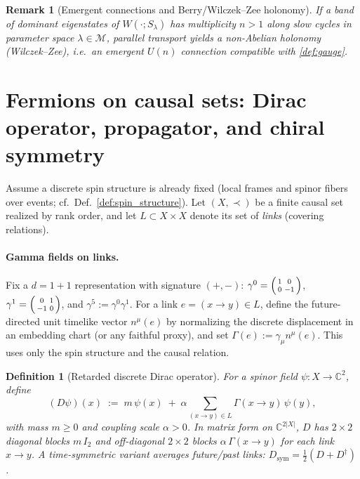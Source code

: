 \documentclass[12pt,a4paper]{article}
\newtheorem{definition}{Definition}
\newtheorem{remark}{Remark}
\begin{document}
\begin{remark}[Emergent connections and Berry/Wilczek--Zee holonomy]\label{rem:berry}
If a band of dominant eigenstates of $W(\cdot;S_\lambda)$ has multiplicity $n>1$ along slow cycles in parameter space $\lambda\in\mathcal M$, parallel transport yields a non-Abelian holonomy (Wilczek--Zee), i.e.\ an emergent $U(n)$ connection compatible with \cref{def:gauge}.
\end{remark}


\section{Fermions on causal sets: Dirac operator, propagator, and chiral symmetry}\label{sec:fermions}

Assume a discrete spin structure is already fixed (local frames and spinor fibers over events; cf.\ Def.~\ref{def:spin_structure}).
Let $(X,\prec)$ be a finite causal set realized by rank order, and let $L\subset X\times X$ denote its set of \emph{links} (covering relations).

\paragraph{Gamma fields on links.}
Fix a $d{=}1{+}1$ representation with signature $(+,-)$:
$\gamma^0=\begin{psmallmatrix}1&0\\[2pt]0&-1\end{psmallmatrix}$,
$\gamma^1=\begin{psmallmatrix}0&1\\[2pt]-1&0\end{psmallmatrix}$, and $\gamma^5:=\gamma^0\gamma^1$.
For a link $e=(x\to y)\in L$, define the future-directed unit timelike vector
$n^\mu(e)$ by normalizing the discrete displacement in an embedding chart (or any faithful proxy),
and set $\Gamma(e):=\gamma_\mu n^\mu(e)$. This uses only the spin structure and the causal relation.

\begin{definition}[Retarded discrete Dirac operator]\label{def:retarded-dirac}
For a spinor field $\psi:X\to\mathbb C^2$, define
\begin{equation}\label{eq:discrete_dirac}
  (D\psi)(x)\;:=\; m\,\psi(x)\;+\;\alpha\!\!\sum_{(x\to y)\in L}\!\! \Gamma(x\to y)\,\psi(y),
\end{equation}
with mass $m\ge 0$ and coupling scale $\alpha>0$. In matrix form on $\mathbb C^{2|X|}$, $D$
has $2\times2$ diagonal blocks $m\,I_2$ and off-diagonal $2\times2$ blocks $\alpha\,\Gamma(x\to y)$ for each link $x\to y$.
A time-symmetric variant averages future/past links: $D_{\mathrm{sym}}=\tfrac{1}{2}(D+D^\dagger)$.
\end{definition}
\end{document}
